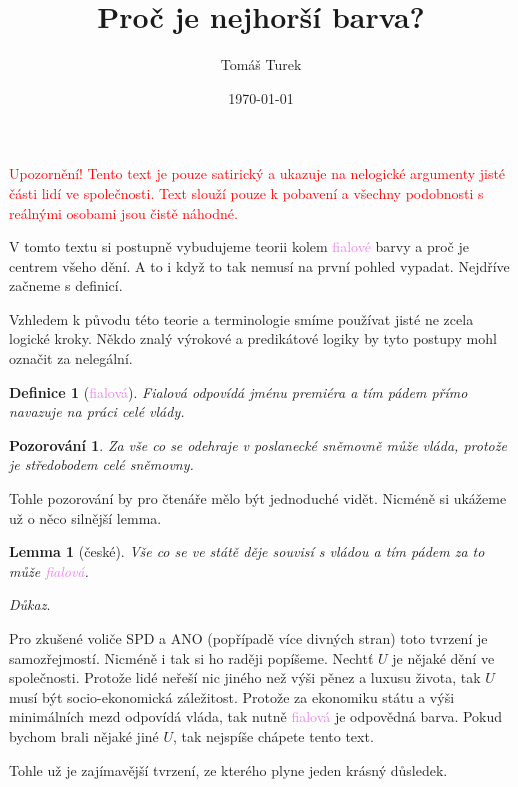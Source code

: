 \documentclass[12pt, a4paper]{article}
\title{Proč je \fialova{á} nejhorší barva?}
\author{Tomáš Turek}
\date{\today}
\theoremstyle{plain}
\newtheorem{lemma}[veta]{Lemma}
\theoremstyle{plain}
\newtheorem{definice}{Definice}
\newtheorem*{pozor}{Pozorování}
\theoremstyle{remark}
\newenvironment{dukaz}{
	\par\medskip\noindent
	\textit{Důkaz}.
}{
	\newline
	\rightline{$\qedsymbol$}
}
\newcommand{\fialova}[1]{\textcolor{violet}{fialov#1}}
\begin{document}
	\maketitle
	
	\begin{center}
		{\small \textcolor{red}{Upozornění! Tento text je pouze satirický a ukazuje na nelogické argumenty jisté části lidí ve společnosti. Text slouží pouze k pobavení a všechny podobnosti s reálnými osobami jsou čistě náhodné.}}
	\end{center}
	
	V tomto textu si postupně vybudujeme teorii kolem \fialova{é} barvy a proč je centrem všeho dění. A to i když to tak nemusí na první pohled vypadat. Nejdříve začneme s definicí.
	
	Vzhledem k původu této teorie a terminologie smíme používat jisté ne zcela logické kroky. Někdo znalý výrokové a predikátové logiky by tyto postupy mohl označit za nelegální.
	
	\begin{definice}[\fialova{á}]
		Fialová odpovídá jménu premiéra a tím pádem přímo navazuje na práci celé vlády.
	\end{definice}
	
	\begin{pozor}
		Za vše co se odehraje v poslanecké sněmovně může vláda, protože je středobodem celé sněmovny.
	\end{pozor}
	
	Tohle pozorování by pro čtenáře mělo být jednoduché vidět. Nicméně si ukážeme už o něco silnější lemma.
	
	\begin{lemma}[české]
		Vše co se ve státě děje souvisí s vládou a tím pádem za to může \fialova{á}.
	\end{lemma}
	
	\begin{dukaz}
		Pro zkušené voliče SPD a ANO (popřípadě více divných stran) toto tvrzení je samozřejmostí. Nicméně i tak si ho raději popíšeme. Nechtť $U$ je nějaké dění ve společnosti. Protože lidé neřeší nic jiného než výši pěnez a luxusu života, tak $U$ musí být socio-ekonomická záležitost. Protože za ekonomiku státu a výši minimálních mezd odpovídá vláda, tak nutně \fialova{á} je odpovědná barva. Pokud bychom brali nějaké jiné $U$, tak nejspíše chápete tento text.
	\end{dukaz}
	
	Tohle už je zajímavější tvrzení, ze kterého plyne jeden krásný důsledek.
	
\end{document}
